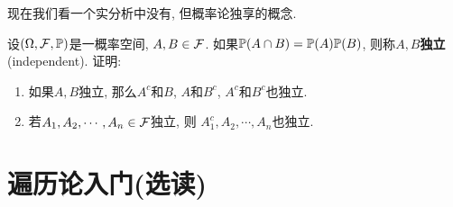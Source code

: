 现在我们看一个实分析中没有, 但概率论独享的概念. 
\begin{example}
    设$(\Omg, \calF, \P)$是一概率空间, $A, B \in \calF$. 
    如果$\P(A \cap B) = \P(A) \P(B)$, 则称$A,B$\textbf{独立}(independent).
    证明:
    \begin{enumerate}
    \item 如果$A, B$独立, 那么$A^c$和$B$, $A$和$B^c$, $A^c$和$B^c$也独立.
    \item 若$A_1, A_2, \cdots, A_n \in \calF$独立, 则
    $A_1^c, A_2, \cdots, A_n$也独立. 
    \end{enumerate}
\end{example}
\section{遍历论入门(选读)}